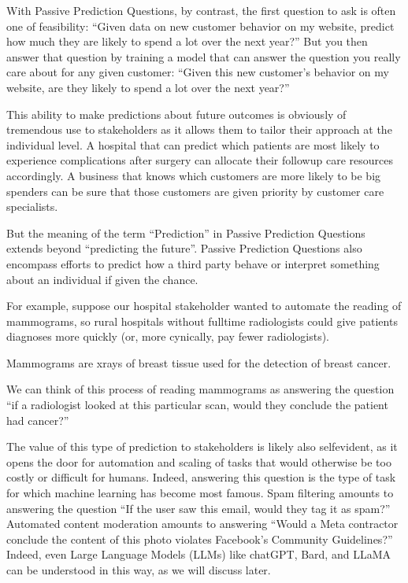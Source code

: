 \documentclass[letterpaper,10pt,english]{jupyterBook}
\begin{document}
\sphinxAtStartPar
With Passive Prediction Questions, by contrast, the first question to ask is often one of feasibility: “Given data on new customer behavior on my website,  predict how much they are likely to spend a lot over the next year?” But you then answer that question by training a model that can answer the question you really care about for any given customer: “Given this new customer’s behavior on my website, are they likely to spend a lot over the next year?”

\sphinxAtStartPar
This ability to make predictions about future outcomes is obviously of tremendous use to stakeholders as it allows them to tailor their approach at the individual level. A hospital that can predict which patients are most likely to experience complications after surgery can allocate their follow\sphinxhyphen{}up care resources accordingly. A business that knows which customers are more likely to be big spenders can be sure that those customers are given priority by customer care specialists.

\sphinxAtStartPar
But the meaning of the term “Prediction” in Passive Prediction Questions extends beyond “predicting the future”. Passive Prediction Questions also encompass efforts to predict how a third party  behave or interpret something about an individual if given the chance.

\sphinxAtStartPar
For example, suppose our hospital stakeholder wanted to automate the reading of mammograms, so rural hospitals without full\sphinxhyphen{}time radiologists could give patients diagnoses more quickly (or, more cynically, pay fewer radiologists).%
\begin{footnote}[3]\sphinxAtStartFootnote
Mammograms are x\sphinxhyphen{}rays of breast tissue used for the detection of breast cancer.
%
\end{footnote} We can think of this process of reading mammograms as answering the question “if a radiologist looked at this particular scan, would they conclude the patient had cancer?”

\sphinxAtStartPar
The value of this type of prediction to stakeholders is likely also self\sphinxhyphen{}evident, as it opens the door for automation and scaling of tasks that would otherwise be too costly or difficult for humans. Indeed, answering this question is the type of task for which machine learning has become most famous. Spam filtering amounts to answering the question “If the user saw this email, would they tag it as spam?” Automated content moderation amounts to answering “Would a Meta contractor conclude the content of this photo violates Facebook’s Community Guidelines?” Indeed, even Large Language Models (LLMs) like chatGPT, Bard, and LLaMA can be understood in this way, as we will discuss later.
\end{document}
